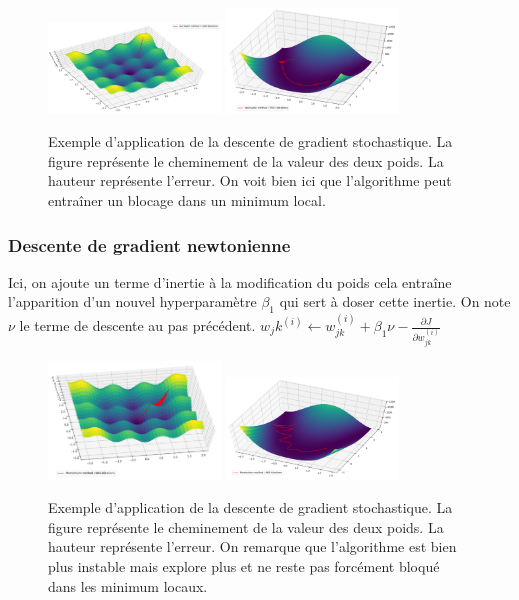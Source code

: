 \begin{figure}[!h]
\centering
\includegraphics[width=130pt]{"images/MLP/descentedegradientstochastique"}
\hspace*{10mm}
\includegraphics[width=130pt]{"images/MLP/descentedegradientstochastiquepropre"}
\caption{Exemple d'application de la descente de gradient stochastique. La figure représente le cheminement de la valeur des deux poids. La hauteur représente l'erreur. On voit bien ici que l'algorithme peut entraîner un blocage dans un minimum local.}
\label{descentedegradientstochastique}
\end{figure}



\subsubsection{Descente de gradient newtonienne}
Ici, on ajoute un terme d'inertie à la modification du poids cela entraîne l'apparition d'un nouvel hyperparamètre $\beta_1$ qui sert à doser cette inertie. On note $\nu$ le terme de descente au pas précédent. $ w_j{k}^{(i)} \leftarrow w_{jk}^{(i)} + \beta_1 \nu - \frac{\partial J}{\partial w_{jk}^{(i)}}$
	
\begin{figure}[!h]
\centering
\includegraphics[width=130pt]{"images/MLP/descentedegradientnewtonnienne"}
\hspace*{10mm}
\includegraphics[width=130pt]{"images/MLP/descentedegradientnewtonniennepropre"}
\caption{Exemple d'application de la descente de gradient stochastique. La figure représente le cheminement de la valeur des deux poids. La hauteur représente l'erreur. On remarque que l'algorithme est bien plus instable mais explore plus et ne reste pas forcément bloqué dans les minimum locaux.}
\label{descentedegradientstochastique}
\end{figure}


